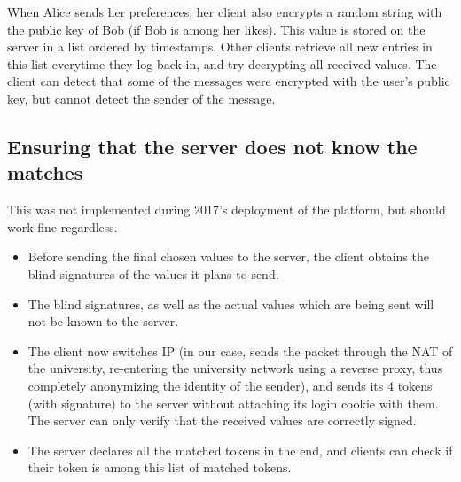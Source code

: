 \documentclass[sigtbd]{sigtbd-style}
\begin{document}
When Alice sends her preferences, her client also encrypts a
random string with the public key of Bob (if Bob is among her
likes). This value is stored on the server in a list ordered by
timestamps. Other clients retrieve all new entries in this list
everytime they log back in, and try decrypting all received
values. The client can detect that some of the messages were encrypted
with the user's public key, but cannot detect the sender of the
message.

\subsection{Ensuring that the server does not know the matches}
This was not implemented during 2017's deployment of the platform, but
should work fine regardless.
\begin{itemize}
\item Before sending the final chosen values to the server, the client
  obtains the blind signatures of the values it plans to send.
\item The blind signatures, as well as the actual values which are
  being sent will not be known to the server.
\item The client now switches IP (in our case, sends the packet
  through the NAT of the university, re-entering the university
  network using a reverse proxy, thus completely anonymizing the
  identity of the sender), and sends its 4 tokens (with
  signature) to the server without attaching its login cookie with
  them. The server can only verify that the received values are
  correctly signed.
\item The server declares all the matched tokens in the end, and
  clients can check if their token is among this list of matched
  tokens.
\end{itemize}
\end{document}
